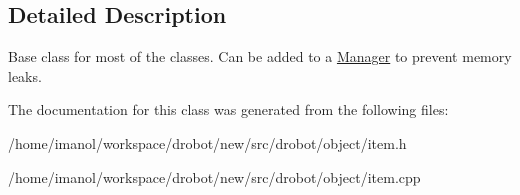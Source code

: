 \subsection{Detailed Description}
Base class for most of the classes. Can be added to a \hyperlink{classdrobot_1_1object_1_1Manager}{Manager} to prevent memory leaks. 

The documentation for this class was generated from the following files\-:\begin{DoxyCompactItemize}
\item 
/home/imanol/workspace/drobot/new/src/drobot/object/item.\-h\item 
/home/imanol/workspace/drobot/new/src/drobot/object/item.\-cpp\end{DoxyCompactItemize}
